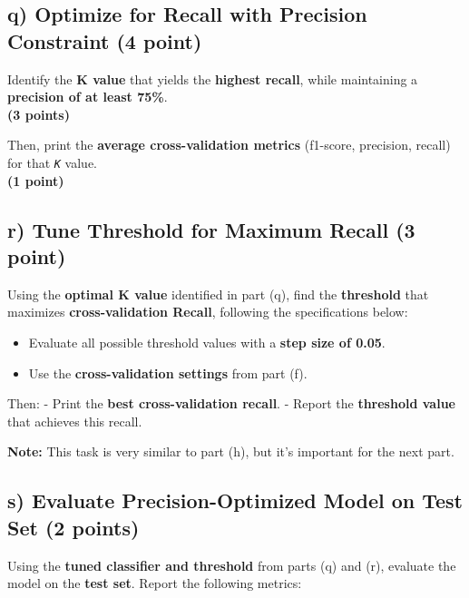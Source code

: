 \documentclass[
  letterpaper,
  DIV=11,
  numbers=noendperiod]{scrreprt}
\providecommand{\tightlist}{%
  \setlength{\itemsep}{0pt}\setlength{\parskip}{0pt}}\usepackage{longtable,booktabs,array}
\begin{document}
\subsection{\texorpdfstring{q) Optimize for Recall with Precision
Constraint \textbf{(4
point)}}{q) Optimize for Recall with Precision Constraint (4 point)}}\label{q-optimize-for-recall-with-precision-constraint-4-point}

Identify the \textbf{K value} that yields the \textbf{highest recall},
while maintaining a \textbf{precision of at least 75\%}.\\
\textbf{(3 points)}

Then, print the \textbf{average cross-validation metrics} (f1-score,
precision, recall) for that \emph{\texttt{K}} value.\\
\textbf{(1 point)}

\subsection{\texorpdfstring{r) Tune Threshold for Maximum Recall
\textbf{(3
point)}}{r) Tune Threshold for Maximum Recall (3 point)}}\label{r-tune-threshold-for-maximum-recall-3-point}

Using the \textbf{optimal K value} identified in part (q), find the
\textbf{threshold} that maximizes \textbf{cross-validation Recall},
following the specifications below:

\begin{itemize}
\tightlist
\item
  Evaluate all possible threshold values with a \textbf{step size of
  0.05}.
\item
  Use the \textbf{cross-validation settings} from part (f).
\end{itemize}

Then: - Print the \textbf{best cross-validation recall}. - Report the
\textbf{threshold value} that achieves this recall.

\textbf{Note:} This task is very similar to part (h), but it's important
for the next part.

\subsection{\texorpdfstring{s) Evaluate Precision-Optimized Model on
Test Set \textbf{(2
points)}}{s) Evaluate Precision-Optimized Model on Test Set (2 points)}}\label{s-evaluate-precision-optimized-model-on-test-set-2-points}

Using the \textbf{tuned classifier and threshold} from parts (q) and
(r), evaluate the model on the \textbf{test set}. Report the following
metrics:
\end{document}
